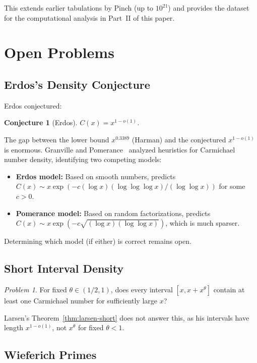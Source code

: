 \documentclass{amsart}
\theoremstyle{plain}
\newtheorem{conjecture}[theorem]{Conjecture}
\theoremstyle{definition}
\theoremstyle{remark}
\newtheorem{problem}[theorem]{Problem}
\begin{document}
This extends earlier tabulations by Pinch (up to $10^{21}$) and provides the dataset for the computational analysis in Part~II of this paper.

\section{Open Problems}\label{sec:open}

\subsection{Erdos's Density Conjecture}

Erdos conjectured:

\begin{conjecture}[Erdos]
\label{conj:erdos}
$C(x) = x^{1 - o(1)}$.
\end{conjecture}

The gap between the lower bound $x^{0.3389}$ (Harman) and the conjectured $x^{1-o(1)}$ is enormous. Granville and Pomerance~\cite{granvillepomerance2002} analyzed heuristics for Carmichael number density, identifying two competing models:
\begin{itemize}
\item \textbf{Erdos model:} Based on smooth numbers, predicts $C(x) \sim x \exp(-c (\log x)(\log \log \log x) / (\log \log x))$ for some $c > 0$.
\item \textbf{Pomerance model:} Based on random factorizations, predicts $C(x) \sim x \exp(-c \sqrt{(\log x)(\log \log x)})$, which is much sparser.
\end{itemize}

Determining which model (if either) is correct remains open.

\subsection{Short Interval Density}

\begin{problem}
For fixed $\theta \in (1/2, 1)$, does every interval $[x, x + x^\theta]$ contain at least one Carmichael number for sufficiently large $x$?
\end{problem}

Larsen's Theorem~\ref{thm:larsen-short} does not answer this, as his intervals have length $x^{1-o(1)}$, not $x^\theta$ for fixed $\theta < 1$.

\subsection{Wieferich Primes}
\end{document}
